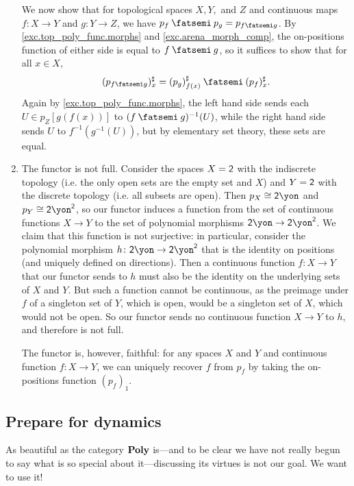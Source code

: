 \documentclass[Book-Poly]{subfiles}
\begin{document}
\begin{exercise}
\begin{solution}
\begin{enumerate}
	We now show that for topological spaces $X,Y,$ and $Z$ and continuous maps $f \colon X \to Y$ and $g \colon Y \to Z$, we have $p_f \then p_g = p_{f \then g}$.
	By \cref{exc.top_poly_func.morphs} and \cref{exc.arena_morph_comp}, the on-positions function of either side is equal to $f \then g$, so it suffices to show that for all $x \in X$,
	\[
	    (p_{f \then g})^\sharp_x = (p_g)^\sharp_{f(x)} \then (p_f)^\sharp_x.
	\]
	Again by \cref{exc.top_poly_func.morphs}, the left hand side sends each $U \in p_Z[g(f(x))]$ to $(f \then g)^{-1}(U)$, while the right hand side sends $U$ to $f^{-1}(g^{-1}(U))$, but by elementary set theory, these sets are equal.
	
	\item The functor is not full.
	Consider the spaces $X = \textsf{2}$ with the indiscrete topology (i.e. the only open sets are the empty set and $X$) and $Y = \textsf{2}$ with the discrete topology (i.e. all subsets are open).
	Then $p_X \iso \2\yon$ and $p_Y \iso \2\yon^\2$, so our functor induces a function from the set of continuous functions $X \to Y$ to the set of polynomial morphisms $\2\yon \to \2\yon^\2$.
	We claim that this function is not surjective: in particular, consider the polynomial morphism $h \colon \2\yon \to \2\yon^\2$ that is the identity on positions (and uniquely defined on directions).
	Then a continuous function $f \colon X \to Y$ that our functor sends to $h$ must also be the identity on the underlying sets of $X$ and $Y$.
	But such a function cannot be continuous, as the preimage under $f$ of a singleton set of $Y$, which is open, would be a singleton set of $X$, which would not be open. 
	So our functor sends no continuous function $X \to Y$ to $h$, and therefore is not full.
	
	The functor is, however, faithful: for any spaces $X$ and $Y$ and continuous function $f \colon X \to Y$, we can uniquely recover $f$ from $p_f$ by taking the on-positions function $(p_f)_1$.
\end{enumerate}
\end{solution}
\end{exercise}


\subsection{Prepare for dynamics}\label{subsec_prepare_dyn}

As beautiful as the category $\mathbf{Poly}$ is---and to be clear we have not really begun to say what is so special about it---discussing its virtues is not our goal. We want to use it!
\end{document}
